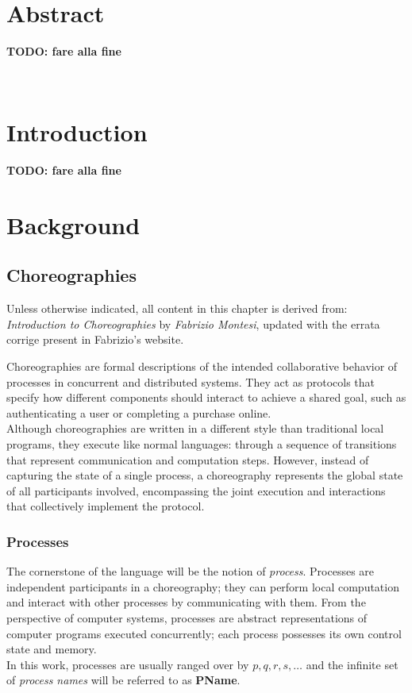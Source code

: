 \documentclass[12pt,a4paper,twoside]{book}
\begin{document}
\newpage~\newpage

\chapter*{Abstract}
\textbf{TODO: fare alla fine}
\topmargin=-1cm

\tableofcontents
\thispagestyle{empty}

\newpage~\newpage


\raggedbottom
\chapter{Introduction} \label{chap:intro}
\pagestyle{plain}
\setcounter{page}{1}
\textbf{TODO: fare alla fine}

\chapter{Background} \label{chap:background}
\section{Choreographies}
\label{background:choreographies}
Unless otherwise indicated, all content in this chapter is derived from: \textit{Introduction to Choreographies\cite{montesi2023introduction}} by \textit{Fabrizio Montesi}, updated with the errata corrige present in Fabrizio's website\cite{montesiChoreographies}.
\vspace{10pt}

Choreographies are formal descriptions of the intended collaborative behavior of processes in concurrent and distributed systems. They act as protocols that specify how different components should interact to achieve a shared goal, such as authenticating a user or completing a purchase online.\\
Although choreographies are written in a different style than traditional local programs, they execute like normal languages: through a sequence of transitions that represent communication and computation steps. However, instead of capturing the state of a single process, a choreography represents the global state of all participants involved, encompassing the joint execution and interactions that collectively implement the protocol.


\subsection{Processes}
The cornerstone of the language will be the notion of \textit{process}. Processes are independent participants in a choreography; they can perform local computation and interact with other processes by communicating with them. From the perspective of computer systems, processes are abstract representations of computer programs executed concurrently; each process possesses its own control state and memory.\\
In this work, processes are usually ranged over by $p, q, r, s, \ldots$ and the infinite set of \textit{process names} will be referred to as \textbf{PName}.
\end{document}
